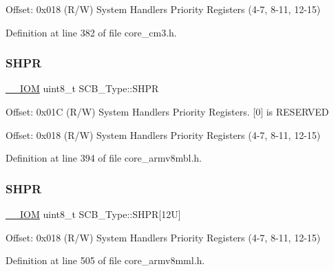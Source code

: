 Offset\+: 0x018 (R/W) System Handlers Priority Registers (4-\/7, 8-\/11, 12-\/15) 

Definition at line 382 of file core\+\_\+cm3.\+h.

\mbox{\label{struct_s_c_b___type_ac6259676cd7892a1b62f3fa7c0930780}} 
\subsubsection{\texorpdfstring{S\+H\+PR}{SHPR}\hspace{0.1cm}{\footnotesize\ttfamily [1/2]}}
{\footnotesize\ttfamily \hyperlink{core__sc300_8h_ab6caba5853a60a17e8e04499b52bf691}{\+\_\+\+\_\+\+I\+OM} uint8\+\_\+t S\+C\+B\+\_\+\+Type\+::\+S\+H\+PR}

Offset\+: 0x01C (R/W) System Handlers Priority Registers. \mbox{[}0\mbox{]} is R\+E\+S\+E\+R\+V\+ED

Offset\+: 0x018 (R/W) System Handlers Priority Registers (4-\/7, 8-\/11, 12-\/15) 

Definition at line 394 of file core\+\_\+armv8mbl.\+h.

\mbox{\label{struct_s_c_b___type_afdab23abd301033bb318c7b188b377db}} 
\subsubsection{\texorpdfstring{S\+H\+PR}{SHPR}\hspace{0.1cm}{\footnotesize\ttfamily [2/2]}}
{\footnotesize\ttfamily \hyperlink{core__sc300_8h_ab6caba5853a60a17e8e04499b52bf691}{\+\_\+\+\_\+\+I\+OM} uint8\+\_\+t S\+C\+B\+\_\+\+Type\+::\+S\+H\+PR\mbox{[}12\+U\mbox{]}}

Offset\+: 0x018 (R/W) System Handlers Priority Registers (4-\/7, 8-\/11, 12-\/15) 

Definition at line 505 of file core\+\_\+armv8mml.\+h.

\mbox{\label{struct_s_c_b___type_ad70825dd0869b7ccd07fb2b8680fcdb6}} 
